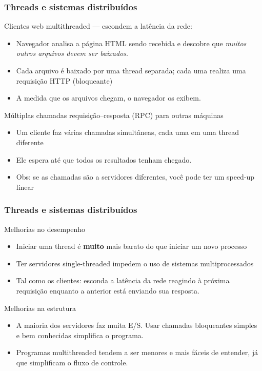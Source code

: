 \documentclass[Ligatures=TeX,table,brazil,svgnames,usetotalslideindicator,compress,10pt]{beamer}
\begin{document}
\begin{frame}
  \frametitle{Threads e sistemas distribuídos}
  \begin{block}{Clientes web multithreaded --- escondem a latência da rede:}
    \begin{itemize}
    \item Navegador analisa a página HTML sendo recebida e descobre que \emph{muitos outros arquivos devem ser baixados}.
    \item Cada arquivo é baixado por uma thread separada; cada uma realiza uma requisição HTTP (bloqueante)
    \item A medida que os arquivos chegam, o navegador os exibem.
    \end{itemize}
  \end{block}

  \begin{block}{Múltiplas chamadas requisição--resposta (RPC) para outras máquinas}
    \begin{itemize}
    \item Um cliente faz várias chamadas simultâneas, cada uma em uma thread diferente
    \item Ele espera até que todos os resultados tenham chegado.
    \item Obs: se as chamadas são a servidores diferentes, você pode ter um \alert{speed-up linear}
    \end{itemize}
  \end{block}

\end{frame}

\begin{frame}
  \frametitle{Threads e sistemas distribuídos}
  \begin{block}{Melhorias no desempenho}
    \begin{itemize}
    \item Iniciar uma thread é \textbf{muito} mais barato do que iniciar um novo processo
    \item Ter servidores single-threaded impedem o uso de sistemas multiprocessados
    \item Tal como os clientes: \alert{esconda a latência da rede} reagindo à próxima requisição enquanto a anterior está enviando sua resposta.
    \end{itemize}
  \end{block}

  \begin{block}{Melhorias na estrutura}
    \begin{itemize}
    \item A maioria dos servidores faz muita E/S. Usar chamadas bloqueantes simples e bem conhecidas simplifica o programa.
    \item Programas multithreaded tendem a ser menores e mais fáceis de entender, já que simplificam o fluxo de controle.
    \end{itemize}
  \end{block}

\end{frame}
\end{document}
